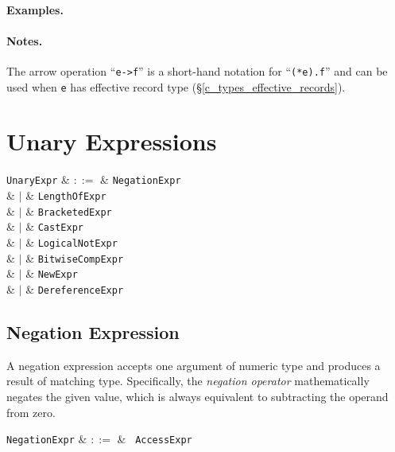 \paragraph{Examples.}

\paragraph{Notes.} The arrow operation ``\lstinline{e->f}'' is a short-hand notation for ``\lstinline{(*e).f}'' and can be used when \lstinline{e} has effective record type (\S\ref{c_types_effective_records}).


\section{Unary Expressions}
\label{c_expr_term}

\begin{syntax}
  \verb+UnaryExpr+ & $::=$ & \verb+NegationExpr+\\
  & $|$ & \verb+LengthOfExpr+\\
  & $|$ & \verb+BracketedExpr+\\
  & $|$ & \verb+CastExpr+\\
  & $|$ & \verb+LogicalNotExpr+\\
  & $|$ & \verb+BitwiseCompExpr+\\
  & $|$ & \verb+NewExpr+\\
  & $|$ & \verb+DereferenceExpr+\\
\end{syntax}


\subsection{Negation Expression}
\label{c_expr_negation}

A negation expression accepts one argument of numeric type and produces a result of matching type.  Specifically, the {\em negation operator} mathematically negates the given value, which is always equivalent to subtracting the operand from zero.

\begin{syntax}
\verb+NegationExpr+ & $::=$ & \token{-}\ \verb+AccessExpr+\\
\end{syntax}

